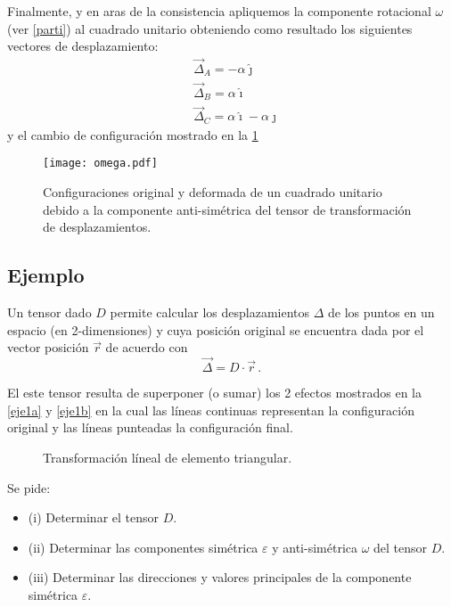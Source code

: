 \documentclass[../notas medios.tex]{subfiles}
\begin{document}
Finalmente, y en aras de la consistencia apliquemos la componente rotacional 
$\omega$ (ver \cref{parti}) al cuadrado unitario obteniendo como resultado los 
siguientes vectores de desplazamiento:
\begin{align*}
&\vec{\Delta}_A =  - \alpha \hat \jmath\\
&\vec{\Delta}_B = \alpha \hat \imath\\
&\vec{\Delta}_C = \alpha \hat \imath - \alpha \hat \jmath
\end{align*}
y el cambio de configuración mostrado en la \cref{rotarota}

\begin{figure}[H]
\centering
	\texttt{[image: omega.pdf]}
	\caption{Configuraciones original y deformada de un cuadrado unitario debido a la componente anti-simétrica del tensor de transformación de desplazamientos.}
	\label{rotarota}
\end{figure}


\subsection*{Ejemplo}
Un tensor dado $D$ permite calcular los desplazamientos $\Delta$   de los 
puntos en un espacio (en 2-dimensiones) y cuya posición original se encuentra 
dada por el vector posición ${\vec r}$   de acuerdo con
\[\vec \Delta  = D \cdot \vec r\, .\]

El este tensor resulta de superponer (o sumar) los 2 efectos mostrados en la \cref{eje1a} y \cref{eje1b} en la cual las líneas continuas representan la configuración original y las líneas punteadas la configuración final.

\begin{figure}[H]
     \centering
     \hspace{0.5cm}
     \caption{Transformación líneal de elemento triangular.}
     \label{steady_state1}
\end{figure}

Se pide:

\begin{itemize}
\item (i) Determinar el tensor $D$.
\item (ii) Determinar las componentes simétrica $\varepsilon$ y anti-simétrica $\omega$ del tensor $D$.
\item (iii) Determinar las direcciones y valores principales de la componente simétrica $\varepsilon$.
\end{itemize}
\end{document}
